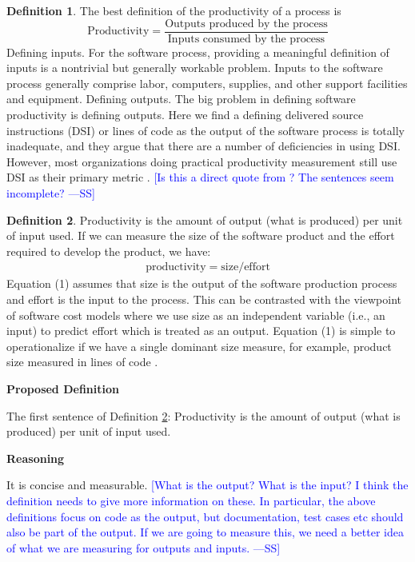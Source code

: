 \documentclass[letterpaper,cleveref]{lipics-v2019}
\newcommand{\authornote}[3]{\textcolor{#1}{[#3 ---#2]}}
\newcommand{\authornote}[3]{}
\newcommand{\wss}[1]{\authornote{blue}{SS}{#1}} %
\theoremstyle{definition}
\newtheorem{defn}{Definition}
\begin{document}
\begin{defn}
  The best definition of the productivity of a process is
  \[\text{Productivity} = \dfrac{\text{Outputs produced by the
        process}}{\text{Inputs consumed by the process}}\] Defining inputs. For
  the software process, providing a meaningful definition of inputs is a
  nontrivial but generally workable problem. Inputs to the software process
  generally comprise labor, computers, supplies, and other support facilities
  and equipment. Defining outputs. The big problem in defining software
  productivity is defining outputs. Here we find a defining delivered source
  instructions (DSI) or lines of code as the output of the software process is
  totally inadequate, and they argue that there are a number of deficiencies in
  using DSI. However, most organizations doing practical productivity
  measurement still use DSI as their primary metric \citep{Boehm1987}. \wss{Is
    this a direct quote from \citet{Boehm1987}?  The sentences seem incomplete?}
\end{defn}

\begin{defn}
  \label{ProductivitySelected}
  Productivity is the amount of output (what is produced) per unit of input
  used. If we can measure the size of the software product and the effort
  required to develop the product, we have:
  \begin{align}
    \text{productivity} = \text{size}/\text{effort}
  \end{align}
  Equation (1) assumes that size is the output of the software production
  process and effort is the input to the process. This can be contrasted with
  the viewpoint of software cost models where we use size as an independent
  variable (i.e., an input) to predict effort which is treated as an
  output. Equation (1) is simple to operationalize if we have a single dominant
  size measure, for example, product size measured in lines of code
  \citep{Kitchenham2004}.
\end{defn}

\noindent \textbf{Proposed Definition} 

The first sentence of Definition \ref{ProductivitySelected}: Productivity is the
amount of output (what is produced) per unit of input used.

\noindent \textbf{Reasoning}

It is concise and measurable. \wss{What is the output?  What is the input?  I
  think the definition needs to give more information on these.  In particular,
  the above definitions focus on code as the output, but documentation, test
  cases etc should also be part of the output.  If we are going to measure this,
  we need a better idea of what we are measuring for outputs and inputs.}
\end{document}
